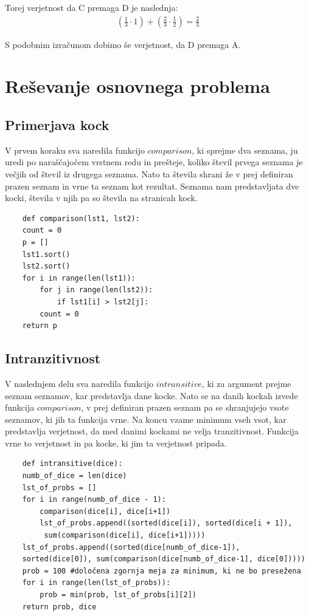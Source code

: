 \documentclass[12pt,a4paper]{amsart}
\begin{document}
Torej verjetnost da C premaga D je naslednja:
\begin{align*}
    (\frac{1}{3}\cdot 1)+(\frac{2}{3}\cdot\frac{1}{2}) = \frac{2}{3}
\end{align*}

S podobnim izračunom dobimo še verjetnost, da D premaga A.


\section{Reševanje osnovnega problema}
\subsection{Primerjava kock}
V prvem koraku sva naredila funkcijo $comparison$, ki \linebreak
sprejme dva seznama, ju uredi po naraščajočem vrstnem redu in prešteje, koliko števil prvega seznama je večjih od števil iz drugega seznama. Nato ta števila shrani že 
v prej definiran prazen seznam in vrne ta seznam kot rezultat.
Seznama nam predstavljata dve kocki, števila v njih pa so števila na stranicah kock.
 \begin{verbatim}
    def comparison(lst1, lst2):
    count = 0
    p = []
    lst1.sort()
    lst2.sort()
    for i in range(len(lst1)):
        for j in range(len(lst2)):
            if lst1[i] > lst2[j]:
        count = 0 
    return p
 \end{verbatim}
 \subsection{Intranzitivnost}
 V naslednjem delu sva naredila funkcijo $intransitive$, ki za argument prejme seznam seznamov, kar predstavlja dane kocke.
 Nato se na danih kockah izvede funkcija $comparison$, v prej definiran prazen seznam pa se shranjujejo vsote seznamov, ki jih ta funkcija vrne.
 Na koncu vzame minimum vseh vsot, kar predstavlja verjetnost, da med danimi kockami ne velja tranzitivnost. Funkcija vrne to verjetnost in pa kocke, ki jim ta verjetnost pripada.
 \begin{verbatim}
    def intransitive(dice):
    numb_of_dice = len(dice)
    lst_of_probs = []
    for i in range(numb_of_dice - 1):
        comparison(dice[i], dice[i+1])
        lst_of_probs.append((sorted(dice[i]), sorted(dice[i + 1]),
         sum(comparison(dice[i], dice[i+1]))))
    lst_of_probs.append((sorted(dice[numb_of_dice-1]), 
    sorted(dice[0]), sum(comparison(dice[numb_of_dice-1], dice[0]))))
    prob = 100 #določena zgornja meja za minimum, ki ne bo presežena
    for i in range(len(lst_of_probs)):
        prob = min(prob, lst_of_probs[i][2])
    return prob, dice
 \end{verbatim}
\end{document}
